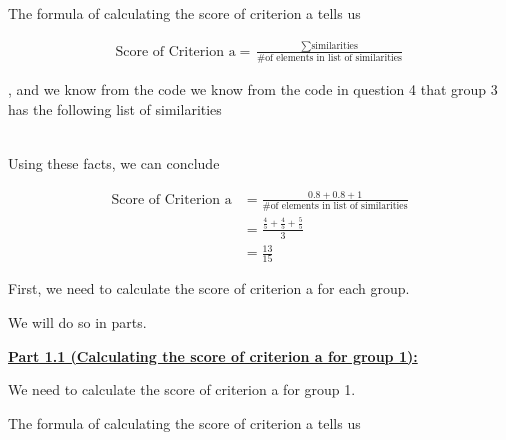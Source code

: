 \documentclass[12pt]{article}
\begin{document}
\begin{mdframed}
\begin{itemize}
\begin{enumerate}[1.]
\begin{mdframed}
                The formula of calculating the score of criterion a tells us

                \begin{align}
                    \text{Score of Criterion a} = \frac{\sum \text{similarities}}{\text{\# of elements in list of similarities}}
                \end{align}

                , and we know from the code we know from the code in question 4 that group 3 has the following
                list of similarities

                \begin{align}
                    [0.8,0.8,1]
                \end{align}

                \bigskip

                Using these facts, we can conclude

                \begin{align}
                    \text{Score of Criterion a} &= \frac{0.8 + 0.8 + 1}{\text{\# of elements in list of similarities}}\\
                    &= \frac{\frac{4}{5} + \frac{4}{5} + \frac{5}{5}}{3}\\
                    &= \frac{13}{15}
                \end{align}

            \end{mdframed}
        \end{enumerate}

        \bigskip

        \begin{mdframed}

            First, we need to calculate the score of criterion a for each group.

            \bigskip

            We will do so in parts.

            \bigskip

            \underline{\textbf{Part 1.1 (Calculating the score of criterion a for group 1):}}

            \bigskip

            We need to calculate the score of criterion a for group 1.

            \bigskip

            The formula of calculating the score of criterion a tells us


\end{mdframed}
\end{itemize}
\end{mdframed}
\end{document}
